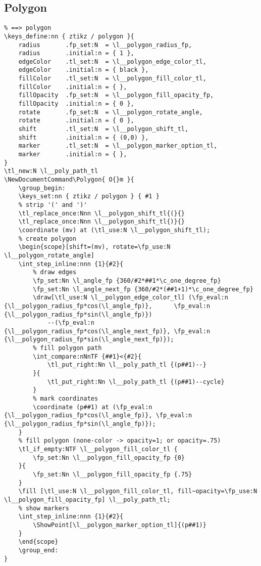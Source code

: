\subsection{Polygon}
\begin{verbatim}
% ==> polygon
\keys_define:nn { ztikz / polygon }{
    radius       .fp_set:N  = \l__polygon_radius_fp,
    radius       .initial:n = { 1 },
    edgeColor    .tl_set:N  = \l__polygon_edge_color_tl,
    edgeColor    .initial:n = { black },
    fillColor    .tl_set:N  = \l__polygon_fill_color_tl,
    fillColor    .initial:n = { },
    fillOpacity  .fp_set:N  = \l__polygon_fill_opacity_fp,
    fillOpacity  .initial:n = { 0 },
    rotate       .fp_set:N  = \l__polygon_rotate_angle,
    rotate       .initial:n = { 0 },
    shift        .tl_set:N  = \l__polygon_shift_tl,
    shift        .initial:n = { (0,0) },
    marker       .tl_set:N  = \l__polygon_marker_option_tl,
    marker       .initial:n = { },
}
\tl_new:N \l__poly_path_tl
\NewDocumentCommand\Polygon{ O{}m }{
    \group_begin:
    \keys_set:nn { ztikz / polygon } { #1 }
    % strip '(' and ')'
    \tl_replace_once:Nnn \l__polygon_shift_tl{(}{}
    \tl_replace_once:Nnn \l__polygon_shift_tl{)}{}
    \coordinate (mv) at (\tl_use:N \l__polygon_shift_tl);
    % create polygon
    \begin{scope}[shift=(mv), rotate=\fp_use:N \l__polygon_rotate_angle]
    \int_step_inline:nnn {1}{#2}{
        % draw edges
        \fp_set:Nn \l_angle_fp {360/#2*##1*\c_one_degree_fp}
        \fp_set:Nn \l_angle_next_fp {360/#2*(##1+1)*\c_one_degree_fp}
        \draw[\tl_use:N \l__polygon_edge_color_tl] (\fp_eval:n {\l__polygon_radius_fp*cos(\l_angle_fp)},      \fp_eval:n {\l__polygon_radius_fp*sin(\l_angle_fp)})
            --(\fp_eval:n {\l__polygon_radius_fp*cos(\l_angle_next_fp)}, \fp_eval:n {\l__polygon_radius_fp*sin(\l_angle_next_fp)});
        % fill polygon path 
        \int_compare:nNnTF {##1}<{#2}{
            \tl_put_right:Nn \l__poly_path_tl {(p##1)--}
        }{
            \tl_put_right:Nn \l__poly_path_tl {(p##1)--cycle}
        }
        % mark coordinates
        \coordinate (p##1) at (\fp_eval:n {\l__polygon_radius_fp*cos(\l_angle_fp)}, \fp_eval:n {\l__polygon_radius_fp*sin(\l_angle_fp)});
    }
    % fill polygon (none-color -> opacity=1; or opacity=.75)
    \tl_if_empty:NTF \l__polygon_fill_color_tl {
        \fp_set:Nn \l__polygon_fill_opacity_fp {0}
    }{
        \fp_set:Nn \l__polygon_fill_opacity_fp {.75}
    }
    \fill [\tl_use:N \l__polygon_fill_color_tl, fill~opacity=\fp_use:N \l__polygon_fill_opacity_fp] \l__poly_path_tl;
    % show markers
    \int_step_inline:nnn {1}{#2}{
        \ShowPoint[\l__polygon_marker_option_tl]{(p##1)}
    }
    \end{scope} 
    \group_end:
}
\end{verbatim}


